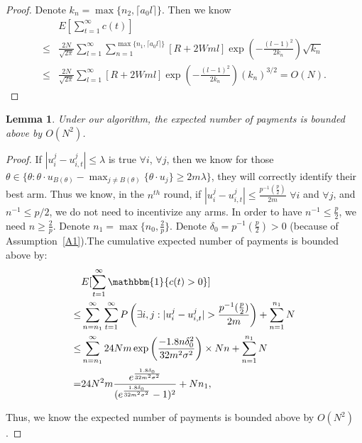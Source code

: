 \documentclass{article}
\newtheorem{lemma}{Lemma}
\begin{document}
\begin{proof}
Denote $k_n=\max\{n_2, \lceil a_0 l \rceil\}$. Then we know
\begin{align}
&E\left[\sum_{t=1}^{\infty}c(t)\right] \nonumber\\
\leq & \frac{2N}{\sqrt{2\pi}}\sum_{l=1}^{\infty}\sum_{n=1}^{\max\{n_1,\lceil a_0 l\rceil\}}\left[R+2Wml\right]\exp\left(-\frac{(l-1)^2}{2k_n}\right)\sqrt{k_n} \nonumber \\
\leq & \frac{2N}{\sqrt{2\pi}}\sum_{l=1}^{\infty}\left[R+2Wml\right]\exp\left(-\frac{(l-1)^2}{2k_n}\right)(k_n)^{3/2}=O(N). \nonumber
\end{align}


\end{proof}


\begin{lemma}
Under our algorithm, the expected number of payments is bounded above by $O(N^2)$.
\end{lemma}

\begin{proof}
If $|u_{i}^{j}-u_{i,t}^{j}|\leq \lambda$ is true $\forall i$, $\forall j$, then we know for those $\theta\in \{\theta:\theta\cdot u_{B(\theta)}-\max_{j\neq B(\theta)}\{\theta \cdot u_{j}\}\geq 2m\lambda\}$, they will correctly identify their best arm. Thus we know, in the $n^{th}$ round, if $|u_{i}^{j}-u_{i,t}^{j}|\leq \frac{p^{-1}(\frac{p}{2})}{2m}$ $\forall i$ and $\forall j$, and $n^{-1}\leq p/2$, we do not need to incentivize any arms. In order to have $n^{-1}\leq \frac{p}{2}$, we need $n\geq \frac{2}{p}$. Denote $n_1=\max\{n_{0}, \frac{2}{p}\}$. Denote $\delta_{0}=p^{-1}(\frac{p}{2})>0$ (because of Assumption~\ref{A1}).The cumulative expected number of payments is bounded above by:
\begin{align}
&E[\sum_{t=1}^{\infty}\mathbbm{1}\{c(t)>0\}] \nonumber \\
\leq &\sum_{n=n_{1}}^{\infty}\sum_{t=1}^{\infty}P\left(\exists i,j:|u_{i}^{j}-u_{i,t}^{j}|>\frac{p^{-1}(\frac{p}{2})}{2m}\right)+\sum_{n=1}^{n_1}N \nonumber \\
\leq & \sum_{n=n_{1}}^{\infty}24Nm \exp\left(\frac{-1.8 n\delta_{0}^2}{32m^2\sigma^2}\right)\times Nn+\sum_{n=1}^{n_1}N \nonumber  \\
=&24N^2 m \frac{e^{\frac{1.8\delta_{0}}{32m^2\sigma^2}}}{(e^{\frac{1.8\delta_{0}}{32m^2\sigma^2}}-1)^2} + Nn_1, \nonumber
\end{align}

Thus, we know the expected number of payments is bounded above by $O(N^2)$.

\end{proof}
\end{document}
